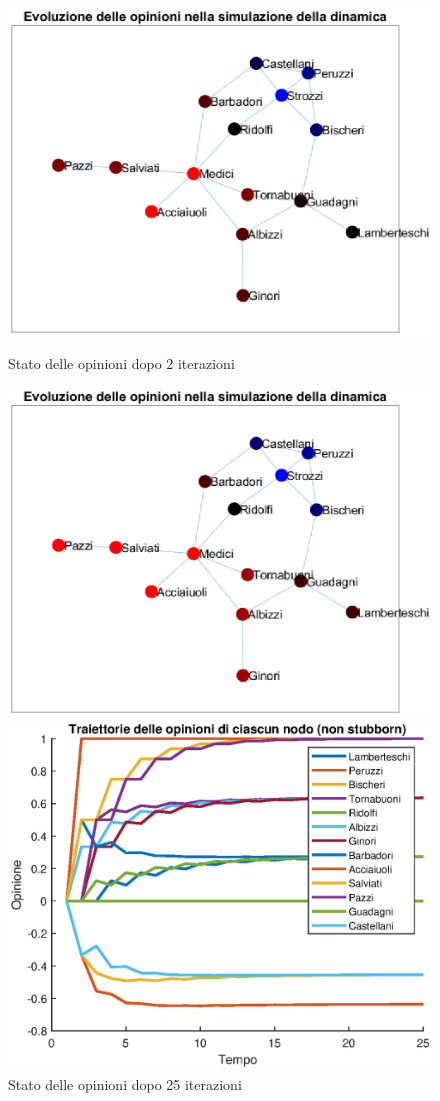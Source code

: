 \documentclass[11pt,largemargins]{homework}
\begin{document}
\begin{alphaparts}
  \begin{figure}[htb]
    \center
     \includegraphics[scale=0.6]{Grafo_2_iterazioni.eps}
    \caption{Stato delle opinioni dopo 2 iterazioni}
    \includegraphics[scale=0.6]{Grafo_25_iter.eps}
    \caption{Stato delle opinioni dopo 25 iterazioni}
    \includegraphics[scale=0.6]{Traiettoria_opinioni.eps}

\end{figure}
\end{alphaparts}
\end{document}
